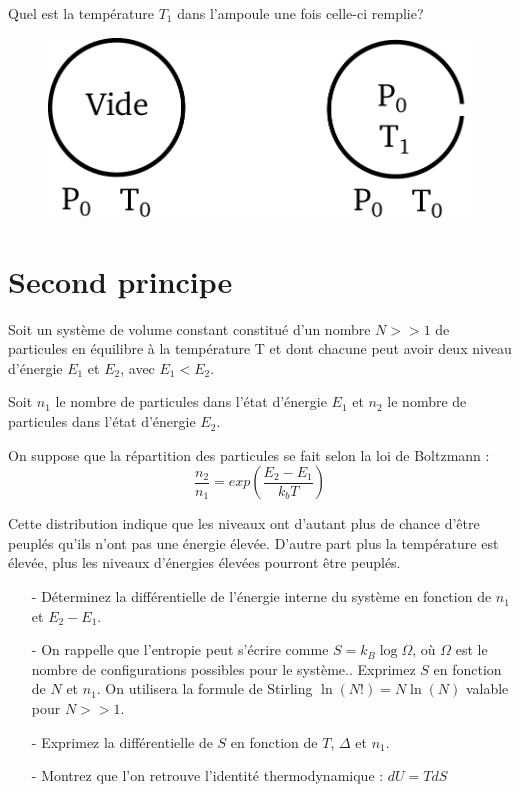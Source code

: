 \documentclass{report}
\begin{document}
Quel est la température $T_{1}$ dans l'ampoule une fois celle-ci remplie?

\begin{figure}[!h]
\centering
\includegraphics[width=0.5\linewidth]{ampoule.pdf}
\end{figure}

\section*{Second principe}

Soit un système de volume constant constitué d'un nombre $N>>1$ de particules en équilibre à la température T et dont chacune peut avoir deux niveau d'énergie $E_{1}$ et $E_{2}$, avec $E_{1}<E_{2}$.

Soit $n_{1}$ le nombre de particules dans l'état d'énergie $E_{1}$ et $n_{2}$ le nombre de particules dans l'état d'énergie $E_{2}$.

On suppose que la répartition des particules se fait selon la loi de Boltzmann :
\begin{equation}
\frac{n_{2}}{n_{1}}=exp\left( \frac{E_{2}-E_{1}}{k_{b}T}\right) 
\end{equation}

Cette distribution indique que les niveaux ont d'autant plus de chance d'être peuplés qu'ils n'ont pas une énergie élevée. D'autre part plus la température est élevée, plus les niveaux d'énergies élevées pourront être peuplés. 

\begin{itemize}
\item[-]Déterminez la différentielle de l'énergie interne du système en fonction de $n_{1}$ et $E_{2}-E_{1}$.
\item[-]On rappelle que l'entropie peut s'écrire comme $S=k_B\log\Omega$, où $\Omega$ est le nombre de configurations possibles pour le système.. Exprimez $S$ en fonction de $N$ et $n_1$. On utilisera la formule de Stirling $\ln (N!)=N \ln (N)$ valable pour $N>>1$.
\item[-] Exprimez la différentielle de $S$ en fonction de $T$, $\Delta$ et $n_1$.
\item[-] Montrez que l'on retrouve l'identité thermodynamique : $dU = TdS$
\end{itemize}
\end{document}
